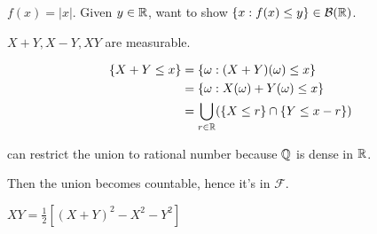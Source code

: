 \documentclass[class=article,crop=false]{standalone}
\begin{document}
\begin{prf}[$ |X|$]
	$ f(x)=|x|$. Given $ y \in \mathbb{R}$, want to show $ \{x:f(x)\leq y\} \in \mathcal{B}( \mathbb{R})$.
\end{prf}
\begin{eg}[]
$X+Y,X-Y,XY$ are measurable.
\end{eg}

\begin{prf}[$X+Y$]
\begin{align*}
	\{X+Y\leq x\} &= \{\omega:(X+Y)(\omega) \leq x\}  \\ 
		      &= \{\omega: X(\omega)+Y(\omega) \leq x\}  \\
		      &= \bigcup_{r \in \mathbb{R}} (\{X\leq r\} \cap \{Y\leq x-r\}  ) \\
\end{align*}
\begin{claim}[]
can restrict the union to rational number because $ \mathbb{Q}$ is dense in $ \mathbb{R}$.
\end{claim}

Then the union becomes countable, hence it's in $ \mathcal{F}$.
\end{prf}
\begin{prf}[$XY$]
	$ XY = \frac{1}{2} [(X+Y)^2-X^2 - Y^2]$
\end{prf}
\end{document}
